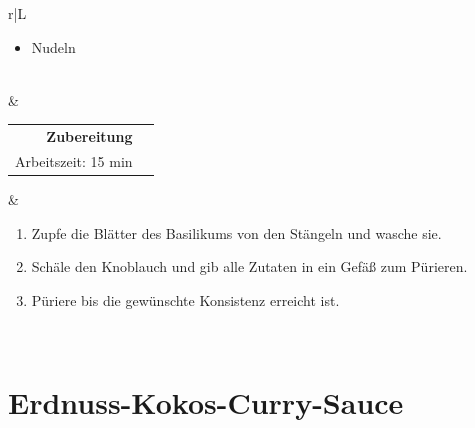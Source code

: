 \documentclass[a4paper, 12pt]{scrbook} 								%
\numberwithin{equation}{section} 									%
\begin{document}
\begin{tabularx}{\textwidth}{r|L}
\begin{itemize}[nosep]
										\item Nudeln
									\end{itemize}	\\
								&	\\	
		\begin{tabular}[t]{rr}
			\textbf{Zubereitung}	\\
			Arbeitszeit: 15 min	\\
		\end{tabular}			&	\begin{enumerate}[nosep]
										\item Zupfe die Blätter des Basilikums von den Stängeln und wasche sie.
										\item Schäle den Knoblauch und gib alle Zutaten in ein Gefäß zum Pürieren.
										\item Püriere bis die gewünschte Konsistenz erreicht ist.
									\end{enumerate}	\\
	\end{tabularx}
	\newpage


	\section{Erdnuss-Kokos-Curry-Sauce}	\label{erdnuss_sauce}
\end{document}
